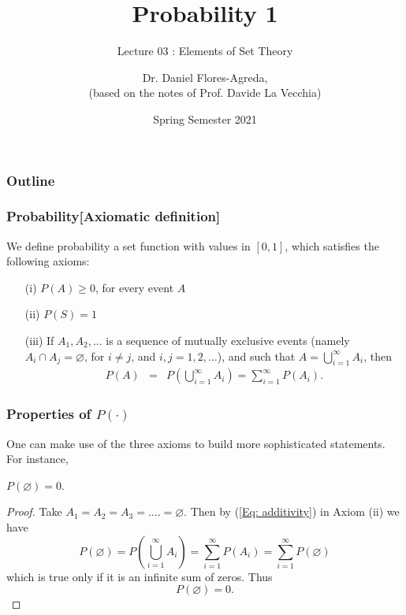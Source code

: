 \documentclass[notes=show,handout]{beamer}\usepackage[]{graphicx}\usepackage[]{color}
\newcommand{\bea}{\begin{eqnarray}}
\newcommand{\eea}{\end{eqnarray}}
\begin{document}
\title[S110015]{Probability 1}
\subtitle{Lecture 03 : Elements of Set Theory}
\author[Flores-Agreda, La Vecchia]{Dr. Daniel Flores-Agreda, \\[0.5em] \tiny{(based on the notes of Prof. Davide La Vecchia)}}
\date{Spring Semester 2021}

\begin{frame}
\titlepage
\end{frame}

\begin{frame}
\frametitle{Outline}
\tableofcontents
\end{frame}

\begin{frame}
\frametitle{Probability[Axiomatic definition]}

\begin{definition}
We define probability a set function with values in $[0,1]$, which
satisfies the following axioms:
\begin{itemize}
\item[ (i)] $P(A) \geq 0$, for every event $A$
\item[ (ii)] $P(S)=1$
\item[ (iii)] If $A_1,A_2,...$ is a sequence of mutually exclusive events (namely \color{red}$A_i \cap A_j =\varnothing$, for $i \neq j$, and $i,j=1,2,...$\color{black}),
and such that
$A = \bigcup_{i=1}^{\infty} A_i$, then
\bea
\label{Eq: additivity}
P(A) &=& P\left(  \bigcup_{i=1}^\infty A_i \right) = \sum_{i=1}^{\infty} P(A_i).
\eea
\end{itemize}
\end{definition}


\end{frame}

\begin{frame}
\frametitle{Properties of $P(\cdot)$}
One can make use of the three axioms to build more sophisticated statements. For instance,

\begin{theorem}
$P(\varnothing)=0$.
\end{theorem}
\vspace{0.3cm}
\begin{footnotesize}{ \begin{proof}
Take $A_1=A_2=A_3=....=\varnothing$. Then by (\ref{Eq: additivity}) in Axiom (ii) we have
$$
P(\varnothing)= P\left(  \bigcup_{i=1}^{\infty} A_i \right) = \sum_{i=1}^{\infty} P(A_i) =\sum_{i=1}^{\infty} P(\varnothing)
$$
which is true only if it is an infinite sum of zeros. Thus
$$
P(\varnothing) =  0.
$$
\end{proof} }\end{footnotesize}
\end{frame}
\end{document}
